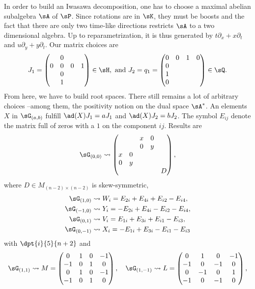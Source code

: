 In order to build an Iwasawa decomposition, one has to choose a maximal abelian subalgebra $\sA$ of $\sP$. Since rotations are in $\sK$, they must be boosts and the fact that there are only two time-like directions restricts $\sA$ to a two dimensional algebra. Up to reparametrization, it is thus generated by $t\partial_x+x\partial_t$ and $u\partial_y+y\partial_t$. Our matrix choices are
\[
   J_1=
\begin{pmatrix}
&0\\
0&0&0&1\\
&0\\
&1
\end{pmatrix}\in\sH,
\textrm{ and }
J_2=q_1=
\begin{pmatrix}
0&0&1&0\\
0\\
1\\
0
\end{pmatrix}\in\sQ.
\]
From here, we have to build root spaces. There still remains a lot of arbitrary choices --among them, the positivity notion on the dual space $\sA^*$. An elements $X$ in $\sG_{(a,b)}$ fulfill $\ad(X)J_1=aJ_1$ and $\ad(X)J_2=bJ_2$. The symbol $E_{ij}$ denote the matrix full of zeros with a $1$ on the component $ij$. Results are
\begin{equation}
\sG_{(0,0)}\leadsto
\begin{pmatrix}
&&x&0\\
&&0&y\\
x&0\\
0&y\\
&&&& D
\end{pmatrix},
\end{equation}
where $D\in M_{(n-2)\times(n-2)}$ is skew-symmetric,
\begin{subequations}
\begin{align}
\sG_{(1,0)}&\leadsto W_i=E_{2i}+E_{4i}+E_{i2}-E_{i4},\\
\sG_{(-1,0)}&\leadsto Y_i=-E_{2i}+E_{4i}-E_{i2}-E_{i4},\\
\sG_{(0,1)}&\leadsto V_i=E_{1i}+E_{3i}+E_{i1}-E_{i3},\\
\sG_{(0,-1)}&\leadsto X_i=-E_{1i}+E_{3i}-E_{i1}-E_{i3}
\end{align}
\end{subequations}
with $\dpt{i}{5}{n+2}$ and
\begin{equation}
\sG_{(1,1)}\leadsto M=
\begin{pmatrix}
   0&1&0&-1\\
   -1&0&1&0\\
   0&1&0&-1\\
   -1&0&1&0
\end{pmatrix},
\quad
\sG_{(1,-1)}\leadsto L=
\begin{pmatrix}
   0&1&0&-1\\
   -1&0&-1&0\\
   0&-1&0&1\\
   -1&0&-1&0
\end{pmatrix},
\end{equation}

